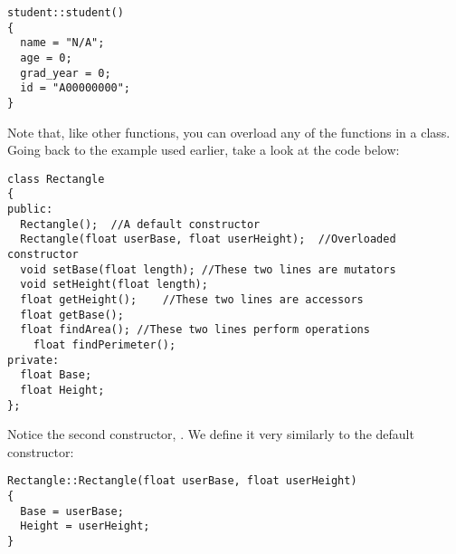 \noindent\begin{minipage}{\linewidth}\begin{lstlisting}
student::student()
{
  name = "N/A";
  age = 0;
  grad_year = 0;
  id = "A00000000";
}
\end{lstlisting}\end{minipage}


Note that, like other functions, you can overload any of the functions in a class. 
Going back to the  example used earlier, take a look at the code below:

\noindent\begin{minipage}{\linewidth}\begin{lstlisting}
class Rectangle
{
public: 
  Rectangle();	//A default constructor
  Rectangle(float userBase, float userHeight);	//Overloaded constructor
  void setBase(float length); //These two lines are mutators
  void setHeight(float length);
  float getHeight();	//These two lines are accessors
  float getBase();	
  float findArea();	//These two lines perform operations
	float findPerimeter();
private:
  float Base;
  float Height;
};
\end{lstlisting}\end{minipage}

Notice the second constructor, . 
We define it very similarly to the default constructor:

\noindent\begin{minipage}{\linewidth}\begin{lstlisting}
Rectangle::Rectangle(float userBase, float userHeight)
{
  Base = userBase;
  Height = userHeight;
}
\end{lstlisting}\end{minipage}


